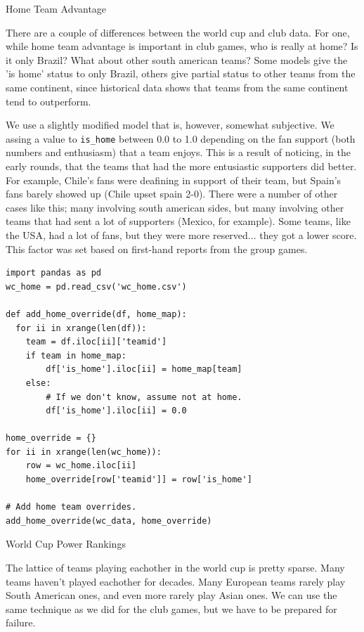 \documentclass[12pt,fleqn]{article}\usepackage{../common}
\begin{document}
Home Team Advantage

There are a couple of differences between the world cup and club data. For
one, while home team advantage is important in club games, who is really at
home? Is it only Brazil? What about other south american teams? Some models
give the 'is home' status to only Brazil, others give partial status to
other teams from the same continent, since historical data shows that teams
from the same continent tend to outperform.

We use a slightly modified model that is, however, somewhat subjective. We
assing a value to \verb!is_home! between 0.0 to 1.0 depending on the fan
support (both numbers and enthusiasm) that a team enjoys. This is a result
of noticing, in the early rounds, that the teams that had the more
entusiastic supporters did better. For example, Chile's fans were deafining
in support of their team, but Spain's fans barely showed up (Chile upset
spain 2-0). There were a number of other cases like this; many involving
south american sides, but many involving other teams that had sent a lot of
supporters (Mexico, for example). Some teams, like the USA, had a lot of
fans, but they were more reserved... they got a lower score. This factor
was set based on first-hand reports from the group games.

\begin{verbatim}
import pandas as pd
wc_home = pd.read_csv('wc_home.csv')

def add_home_override(df, home_map):
  for ii in xrange(len(df)):
    team = df.iloc[ii]['teamid']
    if team in home_map:
        df['is_home'].iloc[ii] = home_map[team]
    else:
        # If we don't know, assume not at home.
        df['is_home'].iloc[ii] = 0.0
        
home_override = {}
for ii in xrange(len(wc_home)):
    row = wc_home.iloc[ii]
    home_override[row['teamid']] = row['is_home']

# Add home team overrides.
add_home_override(wc_data, home_override)    
\end{verbatim}

World Cup Power Rankings

The lattice of teams playing eachother in the world cup is pretty
sparse. Many teams haven't played eachother for decades. Many European
teams rarely play South American ones, and even more rarely play Asian
ones. We can use the same technique as we did for the club games, but we
have to be prepared for failure.
\end{document}
